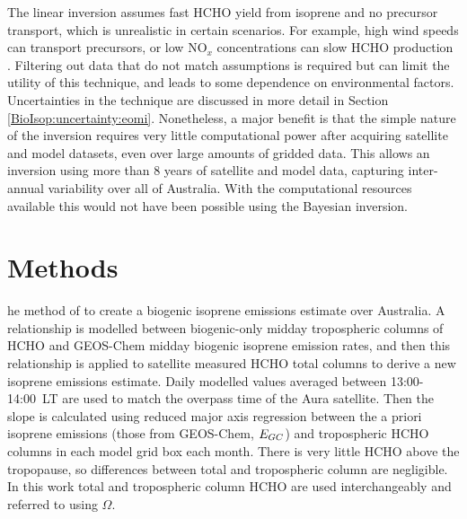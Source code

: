       
      
      The linear inversion assumes fast HCHO yield from isoprene and no precursor transport, which is unrealistic in certain scenarios.
      For example, high wind speeds can transport precursors, or low NO$_x$ concentrations can slow HCHO production \parencite{Palmer2006,Surl2018}.
      Filtering out data that do not match assumptions is required but can limit the utility of this technique, and leads to some dependence on environmental factors.
      Uncertainties in the technique are discussed in more detail in Section \ref{BioIsop:uncertainty:eomi}.
      Nonetheless, a major benefit is that the simple nature of the inversion requires very little computational power after acquiring satellite and model datasets, even over large amounts of gridded data.
      This allows an inversion using more than 8 years of satellite and model data, capturing inter-annual variability over all of Australia.
      With the computational resources available this would not have been possible using the Bayesian inversion.

\section{Methods}
  \label{BioIsop:method}
  
  
  he method of \textcite{Palmer2001}  to create a biogenic isoprene emissions estimate over Australia.
  A relationship is modelled between biogenic-only midday tropospheric columns of HCHO and GEOS-Chem midday biogenic isoprene emission rates, and then this relationship is applied to satellite measured HCHO total columns to derive a new isoprene emissions estimate.
  Daily modelled values averaged between 13:00-14:00~LT are used to match the overpass time of the Aura satellite.
  Then the slope is calculated using reduced major axis regression between the a priori isoprene emissions (those from GEOS-Chem, $E_{GC}$) and tropospheric HCHO columns in each model grid box each month.
  There is very little HCHO above the tropopause, so differences between total and tropospheric column are negligible.
  In this work total and tropospheric column HCHO are used interchangeably and referred to using $\Omega$.
  
